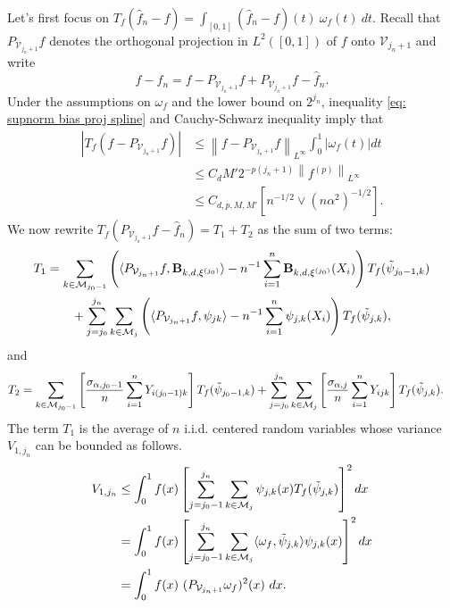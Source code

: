 \documentclass[preprint]{imsart}
\newcommand\norm[1]{\left\lVert#1\right\rVert}
\numberwithin{equation}{section}
\begin{document}
\begin{appendix}
Let's first focus on $T_f(\hat{f}_n-f)=\int_{[0,1]} (\hat{f}_n-f)(t)\ \omega_f(t)\ dt$. Recall that $P_{\mathcal{V}_{j_n+1}}f$ denotes the orthogonal projection in $L^2([0,1])$ of $f$ onto $\mathcal{V}_{j_n+1}$ and write 
\[f-\hat{f}_n = f - P_{\mathcal{V}_{j_n+1}}f + P_{\mathcal{V}_{j_n+1}}f - \hat{f}_n.\]
Under the assumptions on $\omega_f$ and the lower bound on $2^{j_n}$, inequality \eqref{eq: supnorm bias proj spline} and Cauchy-Schwarz inequality imply that 
\begin{align*}
|T_f(f-P_{\mathcal{V}_{j_n+1}}f)|&\leq \norm{f-P_{\mathcal{V}_{j_n+1}}f}_{L^\infty}\int_0^1 |\omega_f(t)|dt \\
&\leq C_d M' 2^{-p(j_n+1)} \norm{f^{(p)}}_{L^\infty}\\
&\leq C_{d,p,M,M'}\left[n^{-1/2}\vee(n\alpha^2)^{-1/2}\right].
\end{align*}
We now rewrite $T_f\left(P_{\mathcal{V}_{j_n+1}}f - \hat{f}_n\right) = T_1+T_2$ as the sum of two terms:
    \begin{align*}T_1&=\sum_{k\in\mathcal{M}_{j_0-1}} \left(\langle P_{\mathcal{V}_{j_n+1}}f , \mathbf{B}_{k,d,\xi^{(j_0)}}\rangle-n^{-1}\sum_{i=1}^n \mathbf{B}_{k,d,\xi^{(j_0)}}(X_i)\right)T_f(\Tilde{\psi}_{j_0-1,k}) \\
    &\quad\quad+ \sum_{j=j_0}^{j_n}\sum_{k\in\mathcal{M}_{j}} \left( \langle P_{\mathcal{V}_{j_n+1}}f , \psi_{jk}\rangle - n^{-1}\sum_{i=1}^n\psi_{j,k}(X_i)\right) T_f(\Tilde{\psi}_{j,k}),
    \end{align*}
    and 
        \begin{align*}T_2&=\sum_{k\in\mathcal{M}_{j_0-1}} \left[\frac{\sigma_{\alpha,j_0-1}}{n} \sum_{i=1}^n Y_{i(j_0-1)k}\right]T_f(\Tilde{\psi}_{j_0-1,k}) + \sum_{j=j_0}^{j_n}\sum_{k\in\mathcal{M}_{j}} \left[\frac{\sigma_{\alpha,j}}{n} \sum_{i=1}^n Y_{ijk}\right] T_f(\Tilde{\psi}_{j,k}).
    \end{align*}
The term $T_1$ is the average of $n$ i.i.d. centered random variables whose variance $V_{1,j_n}$ can be bounded as follows.
     \begin{align*}
         V_{1,j_n} &\leq \int_0^1 f(x)\left[\sum_{j=j_0-1}^{j_n}\sum_{k\in\mathcal{M}_{j}} \psi_{j,k}(x)T_f(\Tilde{\psi}_{j,k})\right]^2dx \\
        &= \int_0^1 f(x)\left[\sum_{j=j_0-1}^{j_n}\sum_{k\in\mathcal{M}_{j}} \langle \omega_f, \Tilde{\psi}_{j,k} \rangle \psi_{j,k}(x) \right]^2dx\\
        &= \int_0^1 f(x)\ (P_{\mathcal{V}_{j_n+1}}\omega_f)^2(x)\ dx.
     \end{align*}


\end{appendix}
\end{document}
